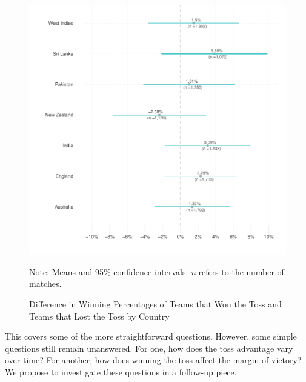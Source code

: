 \documentclass[12pt]{article}
\begin{document}
\begin{figure}[htbp]
\centering
\caption{Difference in Winning Percentages of Teams that Won the Toss and Teams that Lost the Toss by Country}
\includegraphics[scale=.85]{../figs/winbyCountry.pdf}
{\footnotesize Note: Means and 95\% confidence intervals. \emph{n} refers to the number of matches.\par}
\label{fig:country}
\end{figure}

This covers some of the more straightforward questions. However, some simple questions still remain unanswered. For one, how does the toss advantage vary over time? For another, how does winning the toss affect the margin of victory?  We propose to investigate these questions in a follow-up piece.

\clearpage


\end{document}
